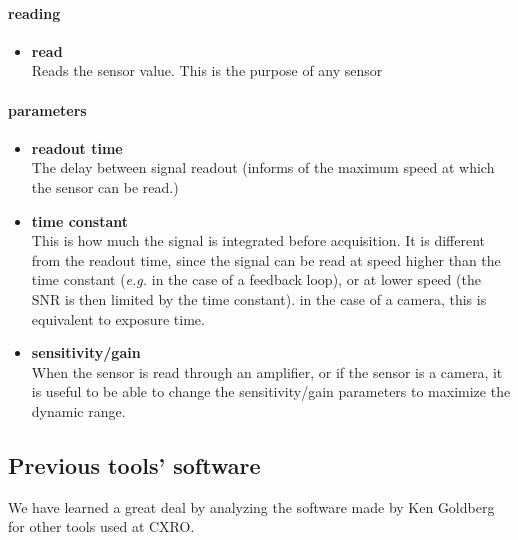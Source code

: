 \documentclass[10pt,letter,twoside]{report}
\begin{document}
			\paragraph{reading}
			\begin{itemize}
			\item \textbf{read}\\
			Reads the sensor value. This is the purpose of any sensor
			\end{itemize}

			\paragraph{parameters}		
			\begin{itemize}
			\item \textbf{readout time}\\
			The delay between signal readout (informs of the maximum speed at which the sensor can be read.)
			\item \textbf{time constant}\\
			This is how much the signal is integrated before acquisition. 
			It is different from the readout time, since the signal can be read at speed higher than the time constant 
			(\textit{e.g.} in the case of a feedback loop), or at lower speed (the SNR is then limited by the time constant).
			in the case of a camera, this is equivalent to exposure time.
			\item \textbf{sensitivity/gain}\\
			When the sensor is read through an amplifier, or if the sensor is a camera, 
			it is useful to be able to change the sensitivity/gain parameters to maximize the dynamic range.
			\end{itemize}
			
			\subsection{Previous tools' software}
			We have learned a great deal by analyzing the software made by Ken Goldberg for other tools used at CXRO.
\end{document}
